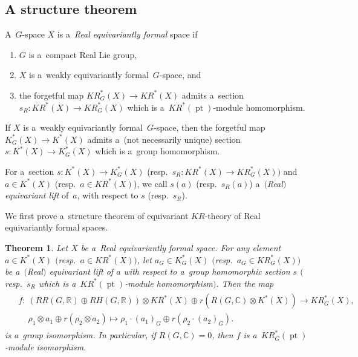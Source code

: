 \documentclass[11pt]{article}
\numberwithin{equation}{section}
\newtheorem{Theorem}{Theorem}[section]
\DeclareMathOperator{\pt}{pt}
\begin{document}
\subsection{A structure theorem}
\begin{Definition}
\label{realequivformal}
A~$G$-space $X$ is a~\emph{Real equivariantly formal} space if
\begin{enumerate}\itemsep=0pt
\item[1)]
$G$ is a~compact Real Lie group,
\item[2)]
$X$ is a~weakly equivariantly formal~$G$-space, and
\item[3)]
the forgetful map $KR^*_G(X)\to KR^*(X)$ admits a~section $s_R: KR^*(X)\to KR^*_G(X)$ which is
a~$KR^*(\pt)$-module homomorphism.
\end{enumerate}
\end{Definition}
\begin{Remark}
If $X$ is a~weakly equivariantly formal~$G$-space, then the forgetful map $K_G^*(X)\to K^*(X)$ admits a~(not necessarily
unique) section $s: K^*(X)\to K_G^*(X)$ which is a~group homomorphism.
\end{Remark}
\begin{Definition}
For a~section $s: K^*(X)\to K^*_G(X)$ (resp.\
$s_R: KR^*(X)\to KR_G^*(X))$ and $a\in K^*(X)$ (resp.\
$a\in KR^*(X)$), we call $s(a)$ (resp.~$s_R(a)$) a~\emph{$($Real$)$ equivariant lift} of~$a$, with respect to $s$ (resp.~$s_R$).
\end{Definition}

We f\/irst prove a~structure theorem of equivariant $KR$-theory of Real equivariantly formal spaces.
\begin{Theorem}
\label{equivstrthm}
Let $X$ be a~Real equivariantly formal space.
For any element $a\in K^*(X)$ $($resp.\
$a\in KR^*(X))$, let $a_G\in K_G^*(X)$ $($resp.\
$a_G\in KR_G^*(X))$ be a~$($Real$)$ equivariant lift of $a$ with respect to a~group homomorphic section $s$ $($resp.~$s_R$ which is a~$KR^*(\pt)$-module homomorphism$)$.
Then the map
\begin{gather*}
\begin{split}
& f:  \ (RR(G, \mathbb{R})\oplus RH(G, \mathbb{R}))\otimes KR^*(X)\oplus r(R(G, \mathbb{C})\otimes K^*(X))  \to  KR_G^*(X),
\\
& \phantom{f: {}} \
\rho_1\otimes a_1\oplus r(\rho_2\otimes a_2)  \mapsto  \rho_1\cdot (a_1)_{G}\oplus r(\rho_2\cdot (a_2)_G).
\end{split}
\end{gather*}
is a~group isomorphism.
In particular, if $R(G, \mathbb{C})=0$, then $f$ is a~$KR_G^*(\pt)$-module isomorphism.
\end{Theorem}
\end{document}
